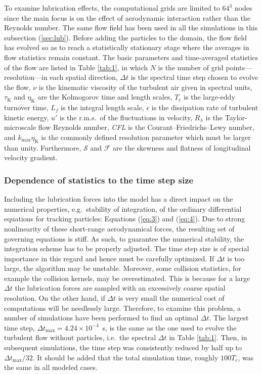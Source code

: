\documentclass[../thesis.tex]{subfiles}
\begin{document}
To examine lubrication effects, the computational grids are limited to $64^3$ nodes since the main focus is on the effect of aerodynamic interaction rather than the Reynolds number. The same flow field has been used in all the simulations in this subsection (\ref{sec:lub}). Before adding the particles to the domain, the flow field has evolved so as to reach a statistically stationary stage where the averages in flow statistics remain constant. The basic parameters and time-averaged statistics of the flow are listed in Table \ref{tab:1}, in which $N$ is the number of grid points---resolution---in each spatial direction, $\Delta t$ is the spectral time step chosen to evolve the flow, $\nu$ is the kinematic viscosity of the turbulent air given in spectral units, $\tau_\text{K}$ and $\eta_\text{K}$ are the Kolmogorov time and length scales, $T_e$ is the large-eddy turnover time, $L_f$ is the integral length scale, $\epsilon$ is the dissipation rate of turbulent kinetic energy, $u'$ is the r.m.s.\ of the fluctuations in velocity, $R_\lambda$ is the Taylor-microscale flow Reynolds number, \textit{CFL} is the Courant--Friedrichs--Lewy number, and $k_\text{max}\eta_\text{K}$ is the commonly defined resolution parameter which must be larger than unity. Furthermore, $\mathcal{S}$ and $\mathcal{F}$ are the skewness and flatness of longitudinal velocity gradient.



\subsubsection{Dependence of statistics to the time step size}
Including the lubrication forces into the model has a direct impact on the numerical properties, e.g.\ stability of integration, of the ordinary differential equations for tracking particles: Equations (\ref{eq:3}) and (\ref{eq:4}). Due to strong nonlinearity of these short-range aerodynamical forces, the resulting set of governing equations is stiff. As such, to guarantee the numerical stability, the integration scheme has to be properly adjusted. The time step size is of special importance in this regard and hence must be carefully optimized. If $\Delta t$ is too large, the algorithm may be unstable. Moreover, some collision statistics, for example the collision kernels, may be overestimated. This is because for a large $\Delta t$ the lubrication forces are sampled with an excessively coarse spatial resolution. On the other hand, if $\Delta t$ is very small the numerical cost of computations will be needlessly large. Therefore, to examine this problem, a number of simulations have been performed to find an optimal $\Delta t$. The largest time step, $\Delta t_\text{max}=4.24\times10^{-4}$~s, is the same as the one used to evolve the turbulent flow without particles, i.e.\ the spectral $\Delta t$ in Table \ref{tab:1}. Then, in subsequent simulations, the time step was consistently reduced by half up to $\Delta t_\text{max}/32$. It should be added that the total simulation time, roughly $100T_e$, was the same in all modeled cases.
\end{document}
